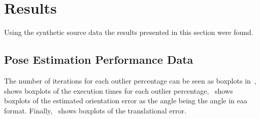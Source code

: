 \section{Results}\label{sec:2-pose-estimation-results}

Using the synthetic source data the results presented in this section were found.

\subsection{Pose Estimation Performance Data}

The number of iterations for each outlier percentage can be seen as boxplots in~,~ shows boxplots of the execution times for each outlier percentage,~ shows boxplots of the estimated orientation error as the angle  being the angle in \gls{eaa} format. Finally,~ shows boxplots of the translational error.

